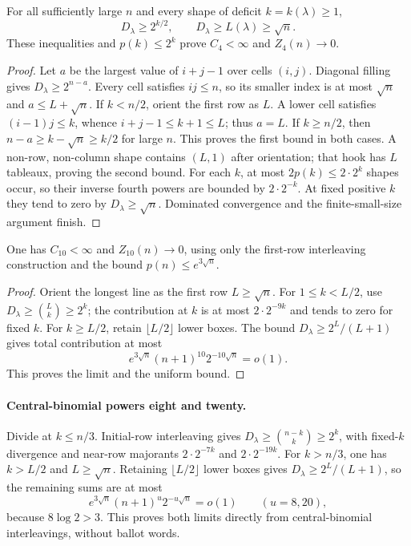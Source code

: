 \begin{lemma}\label{l:degree-diagonal-four}
For all sufficiently large $n$ and every shape of deficit
$k=k(\lambda)\ge1$,
\[
 D_\lambda\ge2^{k/2},\qquad D_\lambda\ge L(\lambda)\ge\sqrt n.
\]
These inequalities and $p(k)\le2^k$ prove $C_4<\infty$ and
$Z_4(n)\to0$.
\end{lemma}
\begin{proof}
Let $a$ be the largest value of $i+j-1$ over cells $(i,j)$.
Diagonal filling gives $D_\lambda\ge2^{n-a}$.
Every cell satisfies $ij\le n$, so its smaller index is at most
$\sqrt n$ and $a\le L+\sqrt n$.
If $k<n/2$, orient the first row as $L$.  A lower cell satisfies
$(i-1)j\le k$, whence $i+j-1\le k+1\le L$; thus $a=L$.
If $k\ge n/2$, then $n-a\ge k-\sqrt n\ge k/2$ for large $n$.
This proves the first bound in both cases.
A non-row, non-column shape contains $(L,1)$ after orientation;
that hook has $L$ tableaux, proving the second bound.
For each $k$, at most $2p(k)\le2\cdot2^k$ shapes occur, so their
inverse fourth powers are bounded by $2\cdot2^{-k}$.
At fixed positive $k$ they tend to zero by $D_\lambda\ge\sqrt n$.
Dominated convergence and the finite-small-size argument finish.
\end{proof}

\begin{lemma}
\label{l:degree-inverse-ten}
One has $C_{10}<\infty$ and $Z_{10}(n)\to0$, using only the
first-row interleaving construction and the bound $p(n)\le e^{3\sqrt n}$.
\end{lemma}
\begin{proof}
Orient the longest line as the first row $L\ge\sqrt n$.
For $1\le k<L/2$, use $D_\lambda\ge\binom Lk\ge2^k$;
the contribution at $k$ is at most $2\cdot2^{-9k}$ and tends to
zero for fixed $k$.
For $k\ge L/2$, retain $\lfloor L/2\rfloor$ lower boxes.
The bound $D_\lambda\ge2^L/(L+1)$ gives total contribution at most
\[
 e^{3\sqrt n}(n+1)^{10}2^{-10\sqrt n}=o(1).
\]
This proves the limit and the uniform bound.
\end{proof}

\paragraph{Central-binomial powers eight and twenty.}
Divide at $k\le n/3$. Initial-row interleaving gives
$D_\lambda\ge\binom{n-k}k\ge2^k$, with fixed-$k$ divergence
and near-row majorants $2\cdot2^{-7k}$ and $2\cdot2^{-19k}$.
For $k>n/3$, one has $k>L/2$ and $L\ge\sqrt n$.
Retaining $\lfloor L/2\rfloor$ lower boxes gives
$D_\lambda\ge2^L/(L+1)$, so the remaining sums are at most
\[
 e^{3\sqrt n}(n+1)^u2^{-u\sqrt n}=o(1)
 \qquad(u=8,20),
\]
because $8\log2>3$. This proves both limits directly from
central-binomial interleavings, without ballot words.

